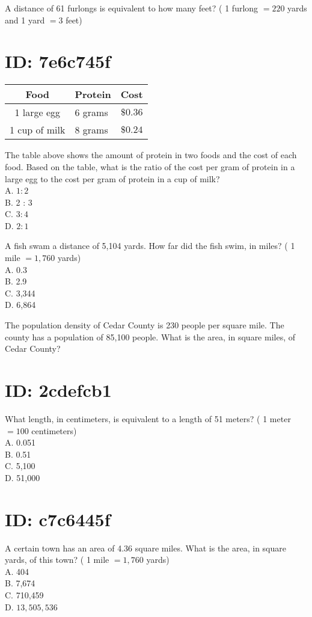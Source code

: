 A distance of 61 furlongs is equivalent to how many feet? ( 1 furlong $=220$ yards and 1 yard $=3$ feet)

\section*{ID: 7e6c745f}
\begin{center}
\begin{tabular}{|c|l|c|}
\hline
Food & Protein & Cost \\
\hline
1 large egg & 6 grams & $\$ 0.36$ \\
\hline
1 cup of milk & 8 grams & $\$ 0.24$ \\
\hline
\end{tabular}
\end{center}

The table above shows the amount of protein in two foods and the cost of each food. Based on the table, what is the ratio of the cost per gram of protein in a large egg to the cost per gram of protein in a cup of milk?\\
A. $1: 2$\\
B. 2 : 3\\
C. $3: 4$\\
D. $2: 1$

A fish swam a distance of 5,104 yards. How far did the fish swim, in miles? ( 1 mile $=1,760$ yards)\\
A. 0.3\\
B. 2.9\\
C. 3,344\\
D. 6,864

The population density of Cedar County is 230 people per square mile. The county has a population of 85,100 people. What is the area, in square miles, of Cedar County?

\section*{ID: 2cdefcb1}
What length, in centimeters, is equivalent to a length of 51 meters? ( 1 meter $=100$ centimeters)\\
A. 0.051\\
B. 0.51\\
C. 5,100\\
D. 51,000

\section*{ID: c7c6445f}
A certain town has an area of 4.36 square miles. What is the area, in square yards, of this town? ( 1 mile $=1,760$ yards)\\
A. 404\\
B. 7,674\\
C. 710,459\\
D. $13,505,536$

